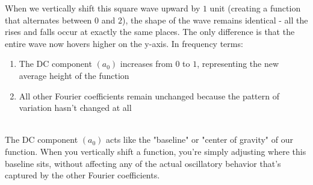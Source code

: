 \documentclass{article}
\begin{document}
When we vertically shift this square wave upward by $1$ unit (creating a function that alternates between $0$ and $2$), the shape of the wave remains identical - all the rises and falls occur at exactly the same places. The only difference is that the entire wave now hovers higher on the y-axis. In frequency terms:\\

\begin{enumerate}
\item The DC component $(a_0)$ increases from $0$ to $1$, representing the new average height of the function
\item All other Fourier coefficients remain unchanged because the pattern of variation hasn't changed at all
\end{enumerate}\\

The DC component $(a_0)$ acts like the "baseline" or "center of gravity" of our function. When you vertically shift a function, you're simply adjusting where this baseline sits, without affecting any of the actual oscillatory behavior that's captured by the other Fourier coefficients.
\end{document}

